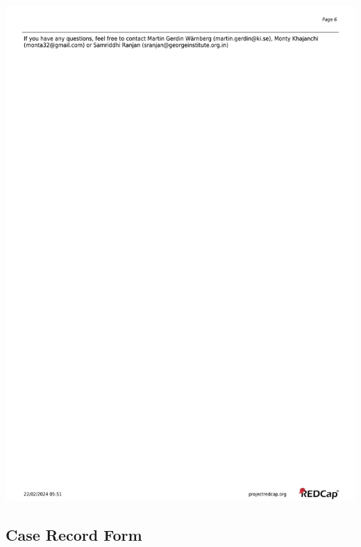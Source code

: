 \documentclass[
]{scrartcl}
\begin{document}
\includegraphics{./appendices/hospital-screening-interview-instrument/hospital-screening-interview-6.pdf}

\hypertarget{sec-appendix-case-record-form}{%
\subsection{Case Record Form}\label{sec-appendix-case-record-form}}
\end{document}
